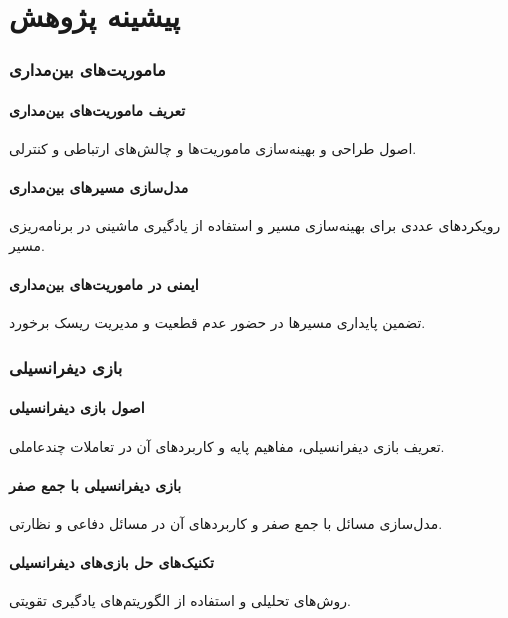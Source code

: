 \chapter{پیشینه پژوهش}









\subsection{ماموریت‌های بین‌مداری}
\subsubsection{تعریف ماموریت‌های بین‌مداری}
اصول طراحی و بهینه‌سازی ماموریت‌ها و چالش‌های ارتباطی و کنترلی.
\subsubsection{مدل‌سازی مسیرهای بین‌مداری}
رویکردهای عددی برای بهینه‌سازی مسیر و استفاده از یادگیری ماشینی در برنامه‌ریزی مسیر.
\subsubsection{ایمنی در ماموریت‌های بین‌مداری}
تضمین پایداری مسیرها در حضور عدم قطعیت و مدیریت ریسک برخورد.

\subsection{بازی دیفرانسیلی}
\subsubsection{اصول بازی دیفرانسیلی}
تعریف بازی دیفرانسیلی، مفاهیم پایه و کاربردهای آن در تعاملات چندعاملی.
\subsubsection{بازی دیفرانسیلی با جمع صفر}
مدل‌سازی مسائل با جمع صفر و کاربردهای آن در مسائل دفاعی و نظارتی.
\subsubsection{تکنیک‌های حل بازی‌های دیفرانسیلی}
روش‌های تحلیلی و استفاده از الگوریتم‌های یادگیری تقویتی.

